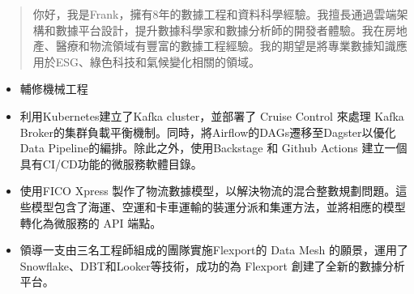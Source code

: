 \documentclass[10pt,a4paper,ragged2e,withhyper]{altacv}
\begin{document}
\begin{paracol}{2}




    \newpage

    \switchcolumn

    \begin{quote}
        你好，我是Frank，擁有8年的數據工程和資料科學經驗。我擅長通過雲端架構和數據平台設計，提升數據科學家和數據分析師的開發者體驗。我在房地產、醫療和物流領域有豐富的數據工程經驗。我的期望是將專業數據知識應用於ESG、綠色科技和氣候變化相關的領域。
    \end{quote}
    \begin{itemize}
        \item 輔修機械工程
    \end{itemize}
    \begin{itemize}
        \item 利用Kubernetes建立了Kafka cluster，並部署了 Cruise Control 來處理 Kafka Broker的集群負載平衡機制。同時，將Airflow的DAGs遷移至Dagster以優化 Data Pipeline的編排。除此之外，使用Backstage 和 Github Actions 建立一個具有CI/CD功能的微服務軟體目錄。
        \item 使用FICO Xpress 製作了物流數據模型，以解決物流的混合整數規劃問題。這些模型包含了海運、空運和卡車運輸的裝運分派和集運方法，並將相應的模型轉化為微服務的 API 端點。
        \item 領導一支由三名工程師組成的團隊實施Flexport的 Data Mesh 的願景，運用了Snowflake、DBT和Looker等技術，成功的為 Flexport 創建了全新的數據分析平台。
    \end{itemize}
    \divider


\end{paracol}
\end{document}
